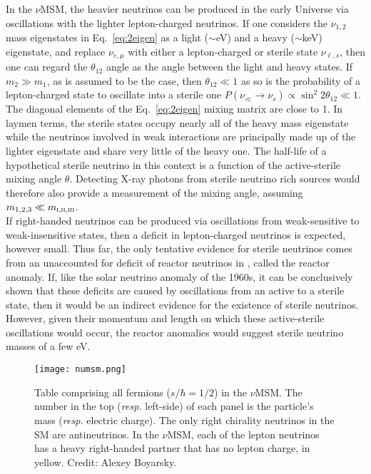 In the $\nu$MSM, the heavier neutrinos can be produced in the early Universe via oscillations with the lighter lepton-charged neutrinos. If one considers the $\nu_{1,2}$ mass eigenstates in Eq.~\ref{eq:2eigen} as a light ($\sim$eV) and a heavy ($\sim$keV) eigenstate, and replace $\nu_{e, \mu}$ with either a lepton-charged or sterile state $\nu_{\ell, s}$, then one can regard the $\theta_{12}$ angle as the angle between the light and heavy states. If $m_{2} \gg m_{1}$, as is assumed to be the case, then $\theta_{12} \ll 1$ as so is the probability of a lepton-charged state to oscillate into a sterile one $P \left( \nu_\ll \rightarrow \nu_s \right) \propto \sin^2 2 \theta_{12} \ll 1$. The diagonal elements of the Eq.~\ref{eq:2eigen} mixing matrix are close to 1. In laymen terms, the sterile states occupy nearly all of the heavy mass eigenstate while the neutrinos involved in weak interactions are principally made up of the lighter eigenstate and share very little of the heavy one. The half-life of a hypothetical sterile neutrino in this context is a function of the active-sterile mixing angle $\theta$. Detecting X-ray photons from sterile neutrino rich sources would therefore also provide a measurement of the mixing angle, assuming $m_{1,2,3} \ll m_{\textsc{i}, \textsc{ii}, \textsc{iii}}$. \\

If right-handed neutrinos can be produced via oscillations from weak-sensitive to weak-insensitive states, then a deficit in lepton-charged neutrinos is expected, however small. Thus far, the only tentative evidence for sterile neutrinos comes from an unaccounted for deficit of reactor neutrinos in \cite{Anomaly}, called the reactor anomaly. If, like the solar neutrino anomaly of the 1960s, it can be conclusively shown that these deficits are caused by oscillations from an active to a sterile state, then it would be an indirect evidence for the existence of sterile neutrinos. However, given their momentum and length on which these active-sterile oscillations would occur, the reactor anomalies would suggest sterile neutrino masses of a few eV. 

\begin{figure}
\begin{center}
\texttt{[image: numsm.png]}
\caption{Table comprising all fermions ($s/\hbar=1/2$) in the $\nu$MSM. The number in the top (\textit{resp.} left-side) of each panel is the particle's mass (\textit{resp.} electric charge). The only right chirality neutrinos in the SM are antineutrinos. In the $\nu$MSM, each of the lepton neutrinos has a heavy right-handed partner that has no lepton charge, in yellow. Credit: Alexey Boyarsky.}
\label{fig:numsm}
\end{center}
\end{figure}
